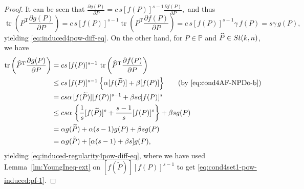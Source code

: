 \documentclass[11pt]{article}
\def\bbP{\mathbb{P}}
\def\bbR{\mathbb{R}}
\def\wtd{\widetilde}
\def\what{\widehat}
\newcommand\STM[2]{{\rm St}(#1,#2)}
\newcommand\STMnbr{{\rm St}_{\delta}(k,n)}
\DeclareMathOperator{\tr}{tr}
\DeclareMathOperator{\T}{T}
\newtheorem{theorem}{Theorem}[section]
\theoremstyle{definition}
\newtheorem{remark}{Remark}[section]
\numberwithin{equation}{section}
\begin{document}
\begin{proof}
It can be seen that
$
\frac{\partial g(P)}{\partial P}=c\,s[f(P)]^{s-1}\frac{\partial f(P)}{\partial P},
$
and thus
$$
\tr\left(P^{\T}\frac{\partial g(P)}{\partial P}\right)=c\,s[f(P)]^{s-1}\tr\left(P^{\T}\frac{\partial f(P)}{\partial P}\right)
  =c\,s[f(P)]^{s-1}\gamma\, f(P)
  =s\gamma\, g(P),
$$
yielding \eqref{eq:induced4pow-diff-eq}. On the other hand, for $P\in\bbP$ and $\what P\in\STM{k}{n}$,
we have
\begin{align}
\tr\left(\what P^{\T}\frac{\partial g(P)}{\partial P}\right)
   &=cs\,[f(P)]^{s-1}\,\tr\left(\what P^{\T}\frac{\partial f(P)}{\partial P}\right)
              \notag  \\
   &\le cs\,[f(P)]^{s-1}\,\Big\{\alpha [f(\wtd P)]+\beta [f(P)]\Big\} \qquad (\mbox{by \eqref{eq:cond4AF-NPDo-b}})\notag\\
   &= cs\alpha\,[f(\wtd P)][f(P)]^{s-1}+\beta s c[f(P)]^s  \notag\\
   &\le cs\alpha\,\left\{\frac 1s [f(\wtd P)]^s+\frac {s-1}s [f(P)]^s\right\}+\beta s g(P) \label{eq:cond4set1-pow-induced:pf-1}\\
   &=\alpha g(\wtd P)+\alpha (s-1) g(P)+\beta s g(P) \notag \\
   &=\alpha g(\wtd P)+[\alpha (s-1)+\beta s] g(P), \notag
\end{align}
yielding \eqref{eq:induced-regularity4pow-diff-eq}, where we have used Lemma~\ref{lm:YoungIneq-ext} on
$[f(\wtd P)][f(P)]^{s-1}$ to get \eqref{eq:cond4set1-pow-induced:pf-1}.
\end{proof}

%

\end{document}
